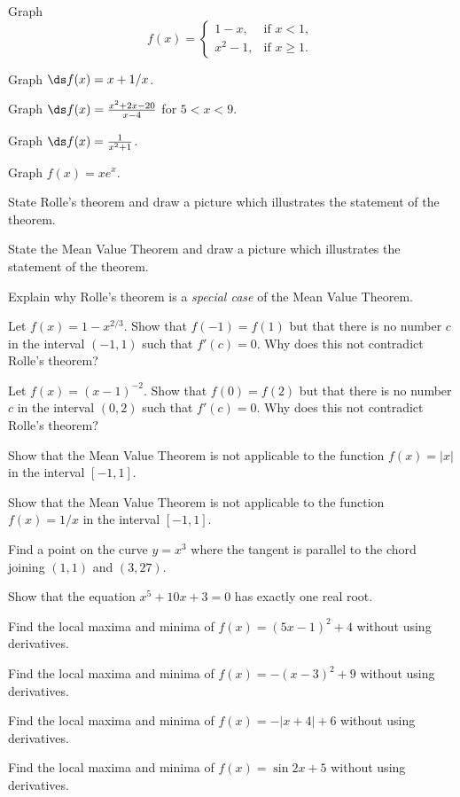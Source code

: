\begin{multicols}{2}
  \problem Graph
  \[
  f(x)=
  \begin{cases}
    1-x,& \text{if } x<1,\\
    x^2-1,&\text{if } x\ge 1.
  \end{cases}
  \]

  \problem Graph $\ds f(x) = x+1/x$.


  \problem Graph $\ds f(x)=\frac{x^2+2x-20}{ x-4} $ for $5<x<9$.


  \problem Graph $\ds f(x) = \frac{1}{ x^2+1} $.


  \problem Graph $f(x)=xe^x$.


  \problem State Rolle's theorem and draw a picture which illustrates the
  statement of the theorem.


  \problem State the Mean Value Theorem and draw a picture which illustrates
  the statement of the theorem.


  \problem Explain why Rolle's theorem is a {\it special case} of the Mean
  Value Theorem.


  \problem Let $f(x)=1-x^{2/3}$.  Show that $f(-1)=f(1)$ but that there is no
  number $c$ in the interval $(-1,1)$ such that $f'(c)=0$.  Why does this not
  contradict Rolle's theorem?


  \problem Let $f(x)=(x-1)^{-2}$.  Show that $f(0)=f(2)$ but that there is no
  number $c$ in the interval $(0,2)$ such that $f'(c)=0$.  Why does this not
  contradict Rolle's theorem?


  \problem Show that the Mean Value Theorem is not applicable to the function
  $f(x)=|x|$ in the interval $[-1,1]$.


  \problem Show that the Mean Value Theorem is not applicable to the function
  $f(x)=1/x$ in the interval $[-1,1]$.


  \problem Find a point on the curve $y=x^3$ where the tangent is parallel to
  the chord joining $(1,1)$ and $(3,27)$.


  \problem Show that the equation $x^5+10x+3=0$ has exactly one real root.


  \problem Find the local maxima and minima of $f(x)=(5x-1)^2+4$ without
  using derivatives.


  \problem Find the local maxima and minima of $f(x)=-(x-3)^2+9$ without
  using derivatives.


  \problem Find the local maxima and minima of $f(x)=-|x+4|+6$ without using
  derivatives.


  \problem Find the local maxima and minima of $f(x)=\sin 2x+5$ without using
  derivatives.



\end{multicols}
